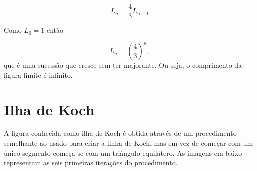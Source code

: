 \documentclass[11pt]{article}
\begin{document}
\[ L_n = \frac{4}{3}L_{n-1} \]

Como $L_0=1$  então

\[ L_n = \left(\frac{4}{3}\right)^n, \]
que é uma sucessão que cresce sem ter majorante. Ou seja, o
comprimento da figura limite é infinito.





\section{Ilha de Koch}

A figura conhecida como ilha de Koch é obtida através de um
procedimento semelhante ao usado para criar a linha de Koch, mas em
vez de começar com um único segmento começa-se com um triângulo
equilátero. As imagens em baixo representam as seis primeiras
iterações do procedimento.
\end{document}
